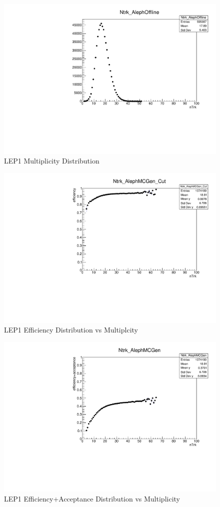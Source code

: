 \begin{figure}[!htb]
\begin{center}
\includegraphics[width=.45\textwidth]{images/MultiplicityConversion/nTrkOffline_ALEPH.pdf}
\caption{LEP1 Multiplicity Distribution}
\label{fig:LEP1Mult} 
\end{center}
\end{figure}

\begin{figure}[!htb]
\begin{center}
\includegraphics[width=.45\textwidth]{images/MultiplicityConversion/nTrk_AlephMCGen_Cut.pdf}
\caption{LEP1 Efficiency Distribution vs Multiplcity}
\label{fig:LEP1Eff} 
\end{center}
\end{figure}

\begin{figure}[!htb]
\begin{center}
\includegraphics[width=.45\textwidth]{images/MultiplicityConversion/nTrk_AlephMCGen.pdf}
\caption{LEP1 Efficiency+Acceptance Distribution vs Multiplicity}
\label{fig:LEP1EffAccept} 
\end{center}
\end{figure}


